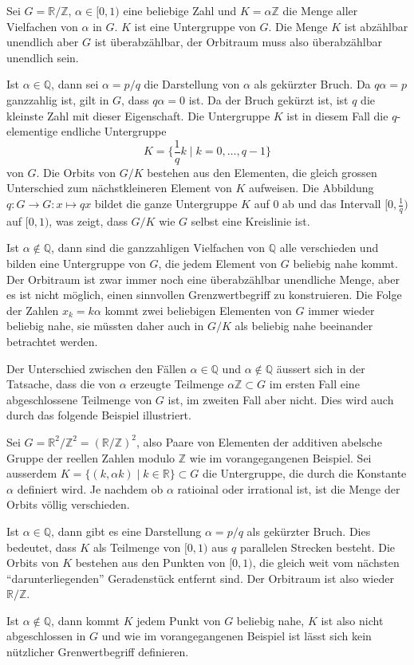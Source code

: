 \begin{beispiel}
Sei $G=\mathbb{R}/\mathbb{Z}$,
$\alpha\in [0,1)$ eine beliebige Zahl und $K=\alpha\mathbb{Z}$
die Menge aller Vielfachen von $\alpha$ in $G$.
$K$ ist eine Untergruppe von $G$.
Die Menge $K$ ist abzählbar unendlich aber $G$ ist überabzählbar,
der Orbitraum muss also überabzählbar unendlich sein.

Ist $\alpha\in\mathbb{Q}$, dann sei $\alpha=p/q$ die Darstellung
von $\alpha$ als gekürzter Bruch.
Da $q\alpha=p$ ganzzahlig ist, gilt in $G$, dass $q\alpha=0$ ist.
Da der Bruch gekürzt ist, ist $q$ die kleinste Zahl mit dieser
Eigenschaft.
Die Untergruppe $K$ ist in diesem Fall die $q$-elementige endliche
Untergruppe
\[
K = \biggl\{ \frac1qk \;\bigg|\; k=0,\dots,q-1 \biggr\}
\]
von $G$.
Die Orbits von $G/K$ bestehen aus den Elementen, die gleich grossen
Unterschied zum nächstkleineren Element von $K$ aufweisen.
Die Abbildung $q\colon G \to G: x\mapsto qx$ bildet die ganze
Untergruppe $K$ auf $0$ ab und das Intervall $[0,\frac1q)$ auf
$[0,1)$, was zeigt, dass $G/K$ wie $G$ selbst eine Kreislinie ist.

Ist $\alpha\not\in \mathbb{Q}$, dann sind die ganzzahligen Vielfachen
von $\mathbb{Q}$ alle verschieden und bilden eine Untergruppe von $G$,
die jedem Element von $G$ beliebig nahe kommt.
Der Orbitraum ist zwar immer noch eine überabzählbar unendliche
Menge, aber es ist nicht möglich, einen sinnvollen Grenzwertbegriff
zu konstruieren.
Die Folge der Zahlen $x_k=k\alpha$ kommt zwei beliebigen Elementen
von $G$ immer wieder beliebig nahe, sie müssten daher auch in $G/K$
als beliebig nahe beeinander betrachtet werden.
\end{beispiel}

Der Unterschied zwischen den Fällen $\alpha\in\mathbb{Q}$ und
$\alpha\not\in\mathbb{Q}$ äussert sich in der Tatsache, dass
die von $\alpha$ erzeugte Teilmenge $\alpha\mathbb{Z}\subset G$ 
im ersten Fall eine abgeschlossene Teilmenge von $G$ ist,
im zweiten Fall aber nicht.
Dies wird auch durch das folgende Beispiel illustriert.

\begin{beispiel}
Sei $G=\mathbb{R}^2/\mathbb{Z}^2 = (\mathbb{R}/\mathbb{Z})^2$,
also Paare von Elementen der additiven abelsche Gruppe der reellen
Zahlen modulo $\mathbb{Z}$ wie im vorangegangenen Beispiel.
Sei ausserdem $K=\{(k,\alpha k)\mid k\in\mathbb{R}\}\subset G$
die Untergruppe, die durch die Konstante $\alpha$ definiert wird.
Je nachdem ob $\alpha$ ratioinal oder irrational ist, ist die Menge der
Orbits völlig verschieden.

Ist $\alpha\in\mathbb{Q}$, dann gibt es eine Darstellung $\alpha=p/q$
als gekürzter Bruch.
Dies bedeutet, dass $K$ als Teilmenge von $[0,1)$ aus $q$ parallelen
Strecken besteht.
Die Orbits von $K$ bestehen aus den Punkten von $[0,1)$, die gleich weit
vom nächsten ``darunterliegenden'' Geradenstück entfernt sind.
Der Orbitraum ist also wieder $\mathbb{R}/\mathbb{Z}$.

Ist $\alpha\not\in\mathbb{Q}$, dann kommt $K$ jedem Punkt von $G$ beliebig
nahe, $K$ ist also nicht abgeschlossen in $G$ und wie im vorangegangenen
Beispiel ist lässt sich kein nützlicher Grenwertbegriff definieren.
\end{beispiel}

